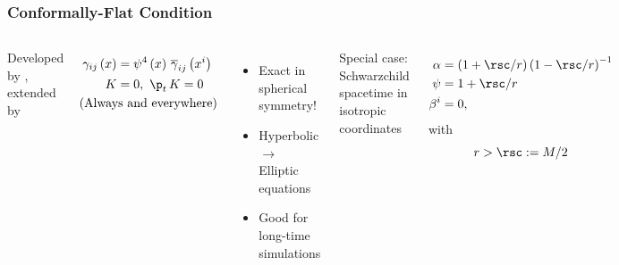 \documentclass{beamer}
\begin{document}
\begin{frame}
\frametitle{Conformally-Flat Condition}

  \begin{columns}[c]


      Developed by \citet{wmm1996}, extended by \citet{cc2009}

      \begin{align*}
        \gamma_{ij}\left(x\right)
        &=\psi^{4}\left(x\right)\,\overline{\gamma}_{ij}\left(x^{i}\right) \\
        K&=0,\ \p_{t}\,K=0 \\
        &\hspace{-3em}\mathrm{(Always\ and\ everywhere)}
      \end{align*}\vspace{1em}

      \begin{itemize}
        \item Exact in spherical symmetry!
        \item Hyperbolic $\rightarrow$ Elliptic equations
        \item Good for long-time simulations
      \end{itemize}


      Special case: Schwarzchild spacetime in isotropic coordinates

      \begin{align*}
        \alpha&=\left(1+\rsc/r\right)\left(1-\rsc/r\right)^{-1} \\
        \psi&=1+\rsc/r \\
        \beta^{i}&=0,
      \end{align*}
      with
      \begin{equation*}
        r>\rsc:=M/2
      \end{equation*}

  \end{columns}

\end{frame}
\end{document}
